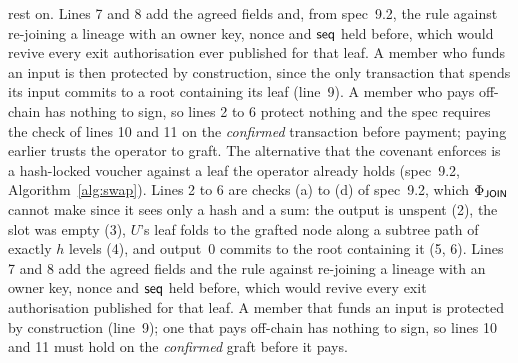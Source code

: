 {rest on. Lines 7 and 8 add the agreed fields and, from spec~9.2, the
rule against re-joining a lineage with an owner key, nonce and $\mathsf{seq}$ held
before, which would revive every exit authorisation ever published for
that leaf. A member who funds an input is then protected by
construction, since the only transaction that spends its input commits to
a root containing its leaf (line~9). A member who pays off-chain has
nothing to sign, so lines 2 to 6 protect nothing and the spec requires
the check of lines 10 and 11 on the \emph{confirmed} transaction before payment;
paying earlier trusts the operator to graft. The alternative that the
covenant enforces is a hash-locked voucher against a leaf the operator
already holds (spec~9.2, Algorithm~\ref{alg:swap}).
\else
Lines 2 to 6 are checks (a) to (d) of spec~9.2, which $\Phi_{\textsf{JOIN}}$
cannot make since it sees only a hash and a sum: the output is unspent
(2), the slot was empty (3), $U$'s leaf folds to the grafted node along a
subtree path of exactly $h$ levels (4), and output~0 commits to the root
containing it (5, 6). Lines 7 and 8 add the agreed fields and the rule
against re-joining a lineage with an owner key, nonce and $\mathsf{seq}$ held
before, which would revive every exit authorisation published for that
leaf. A member that funds an input is protected by construction (line~9);
one that pays off-chain has nothing to sign, so lines 10 and 11 must hold
on the \emph{confirmed} graft before it pays.
\fi
}

